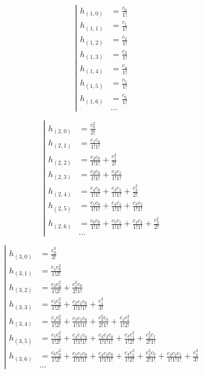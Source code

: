 \begin{equation*} \left| \begin{aligned} 
h_{(1,0)} &= \frac{c_0}{1!} \\ 
h_{(1,1)} &= \frac{c_1}{1!} \\
h_{(1,2)} &= \frac{c_2}{1!} \\
h_{(1,3)} &= \frac{c_3}{1!} \\
h_{(1,4)} &= \frac{c_4}{1!} \\
h_{(1,5)} &= \frac{c_5}{1!} \\
h_{(1,6)} &= \frac{c_6}{1!} \\
&\ldots
\end{aligned} \right. \end{equation*}

\begin{equation*} \left| \begin{aligned} 
h_{(2,0)} &=
  \frac{c_0^2}{2!} \\
%
h_{(2,1)} &=
  \frac{c_1 c_0}{1!1!} \\
%
h_{(2,2)} &=
  \frac{c_2 c_0}{1!1!}
+ \frac{c_1^2}{2!} \\
%
h_{(2,3)} &=
  \frac{c_3 c_0}{1!1!}
+ \frac{c_2 c_1}{1!1!} \\
%
h_{(2,4)} &=
  \frac{c_4 c_0}{1!1!}
+ \frac{c_3 c_1}{1!1!}
+ \frac{c_2^2}{2!} \\
%
h_{(2,5)} &=
  \frac{c_5 c_0}{1!1!}
+ \frac{c_4 c_1}{1!1!}
+ \frac{c_3 c_2}{1!1!} \\
%
h_{(2,6)} &=
  \frac{c_6 c_0}{1!1!}
+ \frac{c_5 c_1}{1!1!}
+ \frac{c_4 c_2}{1!1!}
+ \frac{c_3^2}{2!} \\
%
&\ldots
\end{aligned} \right. \end{equation*}

\begin{equation*} \left| \begin{aligned}
h_{(3,0)} &=
  \frac{c_0^3}{3!} \\ 
%
h_{(3,1)} &=
  \frac{c_1 c_0^2}{1!2!} \\
%
h_{(3,2)} &=
  \frac{c_2 c_0^2}{1!2!} 
+ \frac{c_1^2 c_0}{2!1!} \\
%
h_{(3,3)} &=
  \frac{c_3 c_0^2}{1!2!} 
+ \frac{c_2 c_1 c_0}{1!1!1!} 
+ \frac{c_1^3}{3!} \\
%
h_{(3,4)} &=
  \frac{c_4 c_0^2}{1!2!} 
+ \frac{c_3 c_1 c_0}{1!1!1!} 
+ \frac{c_2^2 c_0}{2!1!} 
+ \frac{c_2 c_1^2}{1!2!} \\
%
h_{(3,5)} &=
  \frac{c_5 c_0^2}{1!2!} 
+ \frac{c_4 c_1 c_0}{1!1!1!} 
+ \frac{c_3 c_2 c_0}{1!1!1!} 
+ \frac{c_3 c_1^2}{1!2!}
+ \frac{c_2^2 c_1}{2!1!} \\
%
h_{(3,6)} &=
  \frac{c_6 c_0^2}{1!2!} 
+ \frac{c_5 c_1 c_0}{1!1!1!} 
+ \frac{c_4 c_2 c_0}{1!1!1!} 
+ \frac{c_4 c_1^2}{1!2!}
+ \frac{c_3^2 c_0}{2!1!} 
+ \frac{c_3 c_2 c_1}{1!1!1!} 
+ \frac{c_2^3}{3!} \\
%
&\ldots
\end{aligned} \right. \end{equation*}

